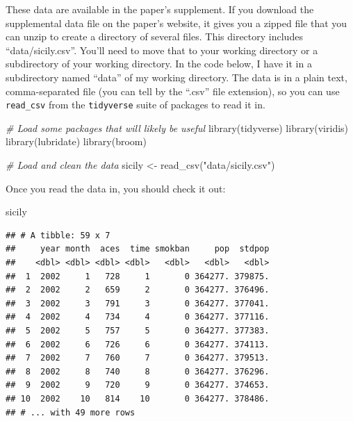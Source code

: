 \documentclass[
]{book}
\newenvironment{Shaded}{\begin{snugshade}}{\end{snugshade}}
\newcommand{\CommentTok}[1]{\textcolor[rgb]{0.56,0.35,0.01}{\textit{#1}}}
\newcommand{\FunctionTok}[1]{\textcolor[rgb]{0.00,0.00,0.00}{#1}}
\newcommand{\NormalTok}[1]{#1}
\newcommand{\OtherTok}[1]{\textcolor[rgb]{0.56,0.35,0.01}{#1}}
\newcommand{\StringTok}[1]{\textcolor[rgb]{0.31,0.60,0.02}{#1}}
\begin{document}
These data are available in the paper's supplement. If you download the supplemental data file on the paper's website, it gives you a zipped file that you can unzip to create a directory of several files. This directory includes ``data/sicily.csv''. You'll need to move that to your working directory or a subdirectory of your working directory. In the code below, I have it in a subdirectory named ``data'' of my working directory. The data is in a plain text, comma-separated file (you can tell by the ``.csv'' file extension), so you can use \texttt{read\_csv} from the \texttt{tidyverse} suite of packages to read it in.

\begin{Shaded}
\begin{Highlighting}[]
\CommentTok{\# Load some packages that will likely be useful}
\FunctionTok{library}\NormalTok{(tidyverse)}
\FunctionTok{library}\NormalTok{(viridis)}
\FunctionTok{library}\NormalTok{(lubridate)}
\FunctionTok{library}\NormalTok{(broom)}

\CommentTok{\# Load and clean the data}
\NormalTok{sicily }\OtherTok{\textless{}{-}} \FunctionTok{read\_csv}\NormalTok{(}\StringTok{"data/sicily.csv"}\NormalTok{)}
\end{Highlighting}
\end{Shaded}

Once you read the data in, you should check it out:

\begin{Shaded}
\begin{Highlighting}[]
\NormalTok{sicily}
\end{Highlighting}
\end{Shaded}

\begin{verbatim}
## # A tibble: 59 x 7
##     year month  aces  time smokban     pop  stdpop
##    <dbl> <dbl> <dbl> <dbl>   <dbl>   <dbl>   <dbl>
##  1  2002     1   728     1       0 364277. 379875.
##  2  2002     2   659     2       0 364277. 376496.
##  3  2002     3   791     3       0 364277. 377041.
##  4  2002     4   734     4       0 364277. 377116.
##  5  2002     5   757     5       0 364277. 377383.
##  6  2002     6   726     6       0 364277. 374113.
##  7  2002     7   760     7       0 364277. 379513.
##  8  2002     8   740     8       0 364277. 376296.
##  9  2002     9   720     9       0 364277. 374653.
## 10  2002    10   814    10       0 364277. 378486.
## # ... with 49 more rows
\end{verbatim}
\end{document}
